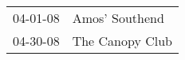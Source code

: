 \begin{supertabular}{p{0.25\columnwidth}p{0.75\columnwidth}}
 04-01-08 &   Amos' Southend \\
 04-30-08 &  The Canopy Club \\
\end{supertabular}
